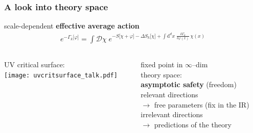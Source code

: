 \documentclass[]{beamer}  %
\begin{document}
\addtocounter{framenumber}{-1}
\begin{frame}
  \frametitle{A look into theory space}
  \vspace{7.5pt}
  scale-dependent \textbf{effective average action}
  \begin{align*}
    \boxed{
    e^{ - \Gamma_k \lbrack \varphi \rbrack }
    = \int \mathcal D \chi \;
    e^{
      - S \lbrack \chi + \varphi \rbrack
      - \Delta S_k \lbrack \chi \rbrack
      + \int \mathrm d^dx \;
      \frac{ \delta \Gamma_k }{ \delta \varphi (x) }
      \, \chi(x)
    }
    }
  \end{align*}
  \vspace{2pt}

  \begin{columns}[T]
    \begin{column}{.6\textwidth}
        UV critical surface:\\[10pt]
        \texttt{[image: uvcritsurface\_talk.pdf]}
    \end{column}
    \begin{column}{.4\textwidth}
      \begin{center}
        fixed point in $\infty$--dim\\ theory space:\\
        \textbf{asymptotic safety} (freedom)\\[20pt]
        relevant directions\\[3pt]
        $\rightarrow$ free parameters (fix in the IR)\\[10pt]
        irrelevant directions\\[3pt]
        $\rightarrow$ predictions of the theory
      \end{center}
    \end{column}
  \end{columns}
\end{frame}


\end{document}
